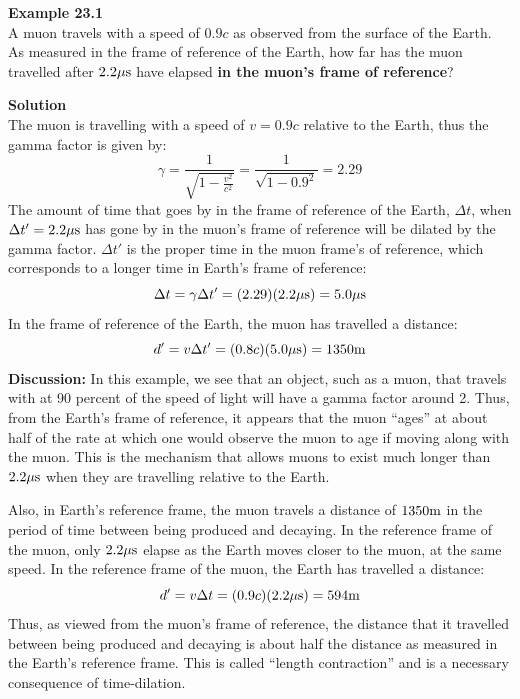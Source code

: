 \begin{framed}
\textbf{Example 23.1}\\
A muon travels with a speed of $0.9c$ as observed from the surface of the Earth. As measured in the frame of reference of the Earth, how far has the muon travelled after $2.2 {\rm \mu s}$ have elapsed \textbf{in the muon's frame of reference}?

\begin{framed}
\textbf{Solution}\\
The muon is travelling with a speed of $v=0.9c$ relative to the Earth, thus the gamma factor is given by:
\begin{equation}
\gamma = \frac{1}{\sqrt{1-\frac{v^2}{c^2}}} =\frac{1}{\sqrt{1-0.9^2}}=2.29
\end{equation}
The amount of time that goes by in the frame of reference of the Earth, $\Delta t$, when $\Delta t'=2.2 {\rm \mu s}$ has gone by in the muon's frame of reference will be dilated by the gamma factor. $\Delta t'$ is the proper time in the muon frame's of reference, which corresponds to a longer time in Earth's frame of reference:
\begin{equation}
\Delta t = \gamma \Delta t' = (2.29)(2.2 {\rm \mu s})=5.0 {\rm \mu s}
\end{equation}
In the frame of reference of the Earth, the muon has travelled a distance:
\begin{equation}
d' = v\Delta t'=(0.8c)(5.0 {\rm \mu s})=1350 {\rm m}
\end{equation}
\textbf{Discussion:} In this example, we see that an object, such as a muon, that travels with at 90 percent of the speed of light will have a gamma factor around 2. Thus, from the Earth's frame of reference, it appears that the muon ``ages'' at about half of the rate at which one would observe the muon to age if moving along with the muon. This is the mechanism that allows muons to exist much longer than $2.2 {\rm \mu s}$ when they are travelling relative to the Earth.

Also, in Earth's reference frame, the muon travels a distance of $1350 {\rm m}$ in the period of time between being produced and decaying. In the reference frame of the muon, only $2.2 {\rm \mu s}$ elapse as the Earth moves closer to the muon, at the same speed. In the reference frame of the muon, the Earth has travelled a distance:
\begin{equation}
d' = v\Delta t=(0.9c)(2.2 {\rm \mu s})=594 {\rm m}
\end{equation}
Thus, as viewed from the muon's frame of reference, the distance that it travelled between being produced and decaying is about half the distance as measured in the Earth's reference frame. This is called ``length contraction'' and is a necessary consequence of time-dilation.
\end{framed}
\end{framed}

